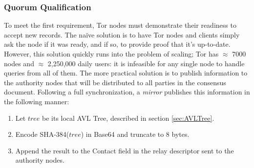 
\subsubsection{Quorum Qualification}

To meet the first requirement, Tor nodes must demonstrate their readiness to accept new records. The na\"{i}ve solution is to have Tor nodes and clients simply ask the node if it was ready, and if so, to provide proof that it's up-to-date. However, this solution quickly runs into the problem of scaling; Tor has $ \approx $ 7000 nodes and $ \approx $ 2,250,000 daily users\cite{TorMetrics}: it is infeasible for any single node to handle queries from all of them. The more practical solution is to publish information to the authority nodes that will be distributed to all parties in the consensus document. Following a full synchronization, a \emph{mirror} publishes this information in the following manner:

\begin{enumerate}
	\item Let $ tree $ be its local AVL Tree, described in section \ref{sec:AVLTree}.
	\item Encode SHA-384($ tree $) in Base64 and truncate to 8 bytes.
	\item Append the result to the Contact field in the relay descriptor sent to the authority nodes.
\end{enumerate}

